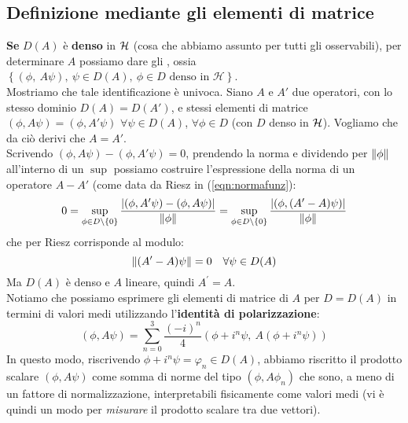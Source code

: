 \documentclass[FisicaTeorica.tex]{subfiles}
\begin{document}
\subsection{Definizione mediante gli elementi di matrice}
\textbf{Se} $D(A)$ è \textbf{denso} in $\mathcal{H}$ (cosa che abbiamo assunto per tutti gli osservabili), per determinare $A$ possiamo dare gli , ossia $\left\{\left(\phi,\ A\psi\right),\ \psi\in D\left(A\right),\ \phi\in D\text{\ denso\ in\ }\mathcal{H}\right\}$.\\
Mostriamo che tale identificazione è univoca. Siano $A$ e $A'$ due operatori, con lo stesso dominio $D(A) = D(A')$, e stessi elementi di matrice $(\phi, A\psi) = (\phi, A'\psi)$ $\forall \psi \in D(A)$, $\forall \phi \in D$ (con $D$ denso in $\mathcal{H}$). Vogliamo che da ciò derivi che $A = A'$.\\
Scrivendo $(\phi, A\psi)-(\phi, A'\psi) = 0$, prendendo la norma e dividendo per $\left\lVert\phi\right\rVert$ all'interno di un $\sup$ possiamo costruire l'espressione della norma di un operatore $A-A'$ (come data da Riesz in (\ref{eqn:normafunz}): 
\[ 0 = \sup_{\phi \in D\setminus \{0\}}\frac{|(\phi, A'\psi)-(\phi, A\psi)|}{\left\lVert\phi\right\rVert} = \sup_{\phi\in D\setminus\{0\}} \frac{|(\phi, (A'-A)\psi)|}{\left\lVert\phi\right\rVert}
\]
che per Riesz corrisponde al modulo: %
\[
\left\lVert(A'-A)\psi\right\rVert = 0 \quad \forall \psi \in D(A)
\] 
	Ma $D(A)$ è denso e $A$ lineare, quindi $A^\prime=A$.\\
	Notiamo che possiamo esprimere gli elementi di matrice di $A$ per $D=D(A)$ in termini di valori medi utilizzando l'\textbf{identità di polarizzazione}:
	\[
	\left(\phi, A\psi\right)= \sum_{n=0}^{3}{\frac{\left(-i\right)^n}{4}(\phi+i^n\psi,\ A\left(\phi+i^n\psi\right))}
	\]
	In questo modo, riscrivendo $\phi + i^n\psi = \varphi_n \in D(A)$, abbiamo riscritto il prodotto scalare $(\phi, A\psi)$ come somma di norme del tipo $(\phi, A\phi_n)$ che sono, a meno di un fattore di normalizzazione, interpretabili fisicamente come valori medi (vi è quindi un modo per \textit{misurare} il prodotto scalare tra due vettori).
\end{document}
